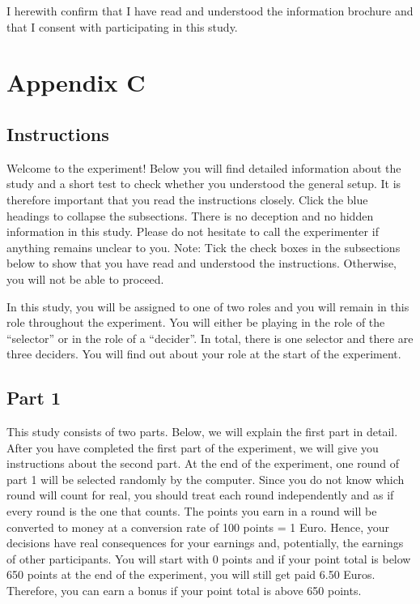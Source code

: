\documentclass[
  man]{apa6}
\begin{document}
I herewith confirm that I have read and understood the information brochure and that I consent with participating in this study.

\newpage

\hypertarget{appendix-c}{%
\section{Appendix C}\label{appendix-c}}

\hypertarget{instructions}{%
\subsection{Instructions}\label{instructions}}

Welcome to the experiment! Below you will find detailed information about the study and a short test to check whether you understood the general setup. It is therefore important that you read the instructions closely. Click the blue headings to collapse the subsections. There is no deception and no hidden information in this study. Please do not hesitate to call the experimenter if anything remains unclear to you. Note: Tick the check boxes in the subsections below to show that you have read and understood the instructions. Otherwise, you will not be able to proceed.

In this study, you will be assigned to one of two roles and you will remain in this role throughout the experiment. You will either be playing in the role of the \enquote{selector} or in the role of a \enquote{decider}. In total, there is one selector and there are three deciders. You will find out about your role at the start of the experiment.

\hypertarget{part-1}{%
\subsection{Part 1}\label{part-1}}

This study consists of two parts. Below, we will explain the first part in detail. After you have completed the first part of the experiment, we will give you instructions about the second part. At the end of the experiment, one round of part 1 will be selected randomly by the computer. Since you do not know which round will count for real, you should treat each round independently and as if every round is the one that counts. The points you earn in a round will be converted to money at a conversion rate of 100 points = 1 Euro. Hence, your decisions have real consequences for your earnings and, potentially, the earnings of other participants. You will start with 0 points and if your point total is below 650 points at the end of the experiment, you will still get paid 6.50 Euros. Therefore, you can earn a bonus if your point total is above 650 points.
\end{document}
